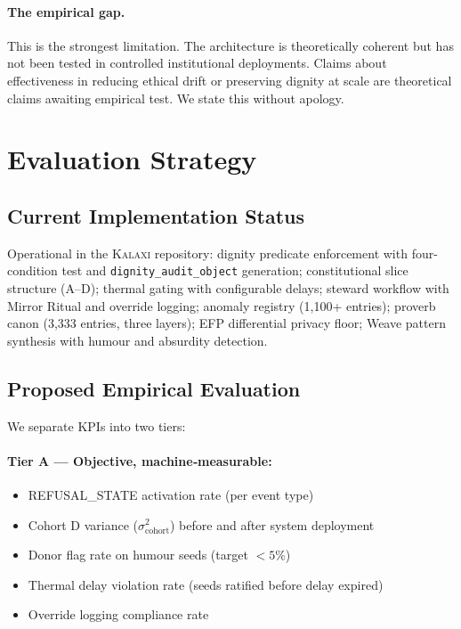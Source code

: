 \documentclass[12pt,a4paper]{article}
\theoremstyle{definition}
\theoremstyle{remark}
\newcommand{\kalaxi}{\textsc{Kalaxi}}
\begin{document}
\paragraph{The empirical gap.}
This is the strongest limitation. The architecture is theoretically coherent but
has not been tested in controlled institutional deployments. Claims about effectiveness
in reducing ethical drift or preserving dignity at scale are theoretical claims
awaiting empirical test. We state this without apology.

\section{Evaluation Strategy}
\label{sec:eval}

\subsection{Current Implementation Status}

Operational in the \kalaxi{} repository: dignity predicate enforcement with
four-condition test and \texttt{dignity\_audit\_object} generation; constitutional
slice structure (A--D); thermal gating with configurable delays; steward workflow
with Mirror Ritual and override logging; anomaly registry (1{,}100+ entries);
proverb canon (3{,}333 entries, three layers); EFP differential privacy floor;
Weave pattern synthesis with humour and absurdity detection.

\subsection{Proposed Empirical Evaluation}

We separate KPIs into two tiers:

\paragraph{Tier A — Objective, machine‑measurable:}
\begin{itemize}
\item REFUSAL\_STATE activation rate (per event type)
\item Cohort D variance ($\sigma^2_\text{cohort}$) before and after system deployment
\item Donor flag rate on humour seeds (target $<5\%$)
\item Thermal delay violation rate (seeds ratified before delay expired)
\item Override logging compliance rate
\end{itemize}
\end{document}
